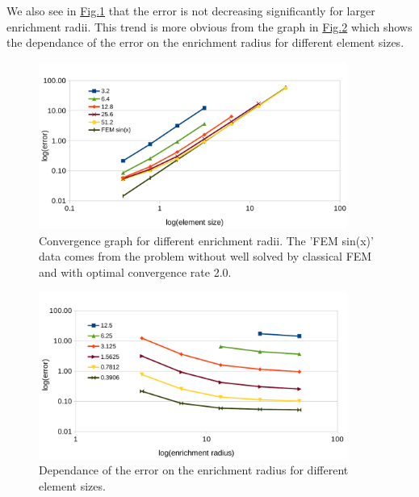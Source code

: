 \documentclass[preprint,12pt]{elsarticle}
\newcommand{\fig}[1]{\hyperref[#1]{Fig.\ref{#1}}}
\newcommand{\figpath}{../graphics/}
\begin{document}
We also see in \fig{fig:radius_conv_1} that the error is not decreasing significantly for larger enrichment 
radii. This trend is more obvious from the graph in \fig{fig:radius_conv_2} which shows the dependance of the
error on the enrichment radius for different element sizes.

\begin{figure}[!htb]
  \centering    
  \includegraphics[width=0.9\textwidth]{results/radius_conv_1.pdf}
  \caption[Enrichment radius choice.]{Convergence graph for different enrichment radii. The 'FEM sin(x)'
  data comes from the problem without well solved by classical FEM and with optimal convergence rate 2.0.}
  \label{fig:radius_conv_1}
\end{figure}
\begin{figure}[!htb]
  \centering    
  \includegraphics[width=0.9\textwidth]{results/radius_conv_2.pdf}
  \caption[Enrichment radius choice.]{Dependance of the error on the enrichment radius for different
  element sizes.}
  \label{fig:radius_conv_2}
\end{figure}
\end{document}
